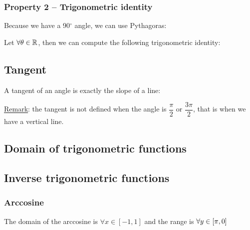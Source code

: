 \documentclass{article}
\begin{document}
\subsubsection{Property 2 -- Trigonometric identity}
Because we have a 90$^\circ$ angle, we can use Pythagoras: 

Let $\displaystyle \forall \theta \in \mathbb{R}$, then we can compute the following trigonometric identity:

\subsection{Tangent}
A tangent of an angle is exactly the slope of a line:

\underline{Remark}: the tangent is not defined when the angle is $\dfrac{\pi}{2}$
or $\dfrac{3\pi}{2}$, that is when we have a vertical line.

\subsection{Domain of trigonometric functions}

\newpage
\subsection{Inverse trigonometric functions}

\subsubsection{Arccosine}
The domain of the arccosine is $\forall x \in \left[-1,1\right]$ and
the range is $\displaystyle \forall y \in \left[\pi, 0\right]$
\end{document}
